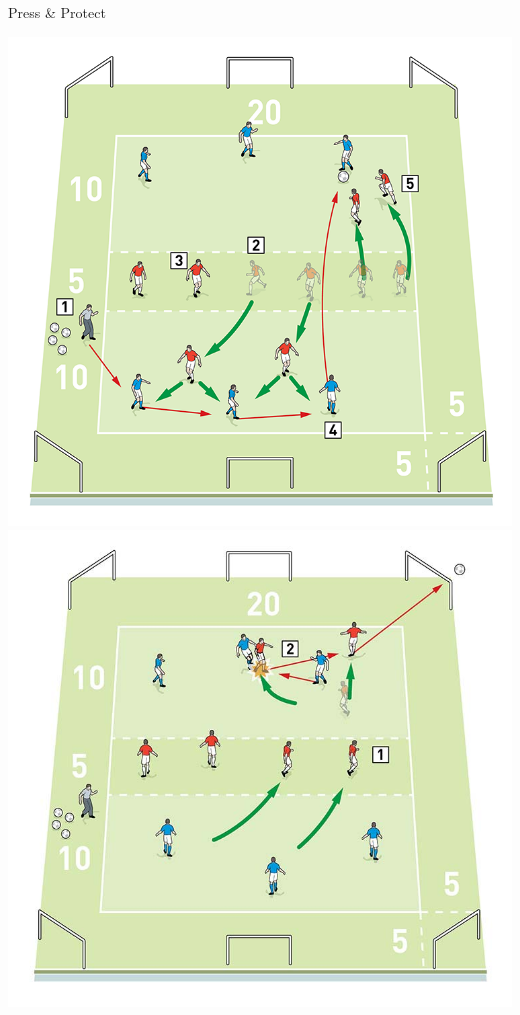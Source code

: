 \begin{evenBlock}{Press \& Protect}

\begin{minipage}[t]{\linewidth}
    \centering
    
    \begin{minipage}{.4\linewidth} %
        \centering
        \includegraphics[width=\textwidth]{../img/Trimmed/Press_Protect}
        \vspace{6pt}
        \includegraphics[width=\textwidth]{../img/Trimmed/Press_Protect_2}

\end{minipage}
\end{minipage}
\end{evenBlock}
